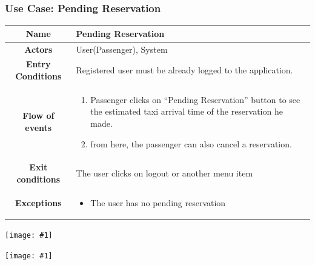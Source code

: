 \documentclass[11pt, a4paper,titlepage]{article}
\newcommand{\image}[1]{
	\begin{center}
		\noindent \texttt{[image: \#1]}
	\end{center}
	}
\begin{document}
\subsubsection{Use Case: Pending Reservation}
		\begin{tabularx}{\textwidth}{| c | X |}
			\hline
			\textbf{Name} & 
			Pending Reservation
			\\
			\hline
			\textbf{Actors} & 
			User(Passenger), System 
			\\
			\hline
			\textbf{Entry Conditions} &
			Registered user must be already logged to the application. 
			\\
			\hline
			\textbf{Flow of events} & 
			\begin{enumerate}
				\item Passenger clicks on “Pending Reservation” button to see the estimated taxi arrival time of the reservation he made.
				\item from here, the passenger can also cancel a reservation.
			\end{enumerate}						
			\\
			\hline
			\textbf{Exit conditions} & 
			The user clicks on logout or another menu item
			\\
			\hline
			\textbf{Exceptions} & 
			\begin{itemize}
				\item The user has no pending reservation
			\end{itemize} 
			\\
			\hline		
		\end{tabularx}
		\image{usecase_pending_reservation.png}
		\image{diagram_sequence_pending_reservation.png}
		\newpage
\end{document}
